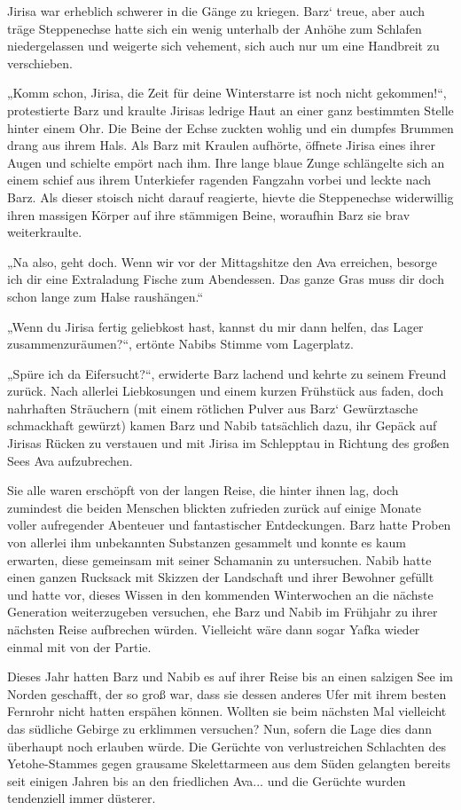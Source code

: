 Jirisa war erheblich schwerer in die Gänge zu kriegen. Barz‘ treue, aber auch träge Steppenechse hatte sich ein wenig unterhalb der Anhöhe zum Schlafen niedergelassen und weigerte sich vehement, sich auch nur um eine Handbreit zu verschieben.

„Komm schon, Jirisa, die Zeit für deine Winterstarre ist noch nicht gekommen!“, protestierte Barz und kraulte Jirisas ledrige Haut an einer ganz bestimmten Stelle hinter einem Ohr. Die Beine der Echse zuckten wohlig und ein dumpfes Brummen drang aus ihrem Hals. Als Barz mit Kraulen aufhörte, öffnete Jirisa eines ihrer Augen und schielte empört nach ihm. Ihre lange blaue Zunge schlängelte sich an einem schief aus ihrem Unterkiefer ragenden Fangzahn vorbei und leckte nach Barz. Als dieser stoisch nicht darauf reagierte, hievte die Steppenechse widerwillig ihren massigen Körper auf ihre stämmigen Beine, woraufhin Barz sie brav weiterkraulte.

„Na also, geht doch. Wenn wir vor der Mittagshitze den Ava erreichen, besorge ich dir eine Extraladung Fische zum Abendessen. Das ganze Gras muss dir doch schon lange zum Halse raushängen.“

„Wenn du Jirisa fertig geliebkost hast, kannst du mir dann helfen, das Lager zusammenzuräumen?“, ertönte Nabibs Stimme vom Lagerplatz.

„Spüre ich da Eifersucht?“, erwiderte Barz lachend und kehrte zu seinem Freund zurück. Nach allerlei Liebkosungen und einem kurzen Frühstück aus faden, doch nahrhaften Sträuchern (mit einem rötlichen Pulver aus Barz‘ Gewürztasche schmackhaft gewürzt) kamen Barz und Nabib tatsächlich dazu, ihr Gepäck auf Jirisas Rücken zu verstauen und mit Jirisa im Schlepptau in Richtung des großen Sees Ava aufzubrechen.

Sie alle waren erschöpft von der langen Reise, die hinter ihnen lag, doch zumindest die beiden Menschen blickten zufrieden zurück auf einige Monate voller aufregender Abenteuer und fantastischer Entdeckungen. Barz hatte Proben von allerlei ihm unbekannten Substanzen gesammelt und konnte es kaum erwarten, diese gemeinsam mit seiner Schamanin zu untersuchen. Nabib hatte einen ganzen Rucksack mit Skizzen der Landschaft und ihrer Bewohner gefüllt und hatte vor, dieses Wissen in den kommenden Winterwochen an die nächste Generation weiterzugeben versuchen, ehe Barz und Nabib im Frühjahr zu ihrer nächsten Reise aufbrechen würden. Vielleicht wäre dann sogar Yafka wieder einmal mit von der Partie.

Dieses Jahr hatten Barz und Nabib es auf ihrer Reise bis an einen salzigen See im Norden geschafft, der so groß war, dass sie dessen anderes Ufer mit ihrem besten Fernrohr nicht hatten erspähen können. Wollten sie beim nächsten Mal vielleicht das südliche Gebirge zu erklimmen versuchen? Nun, sofern die Lage dies dann überhaupt noch erlauben würde. Die Gerüchte von verlustreichen Schlachten des Yetohe-Stammes gegen grausame Skelettarmeen aus dem Süden gelangten bereits seit einigen Jahren bis an den friedlichen Ava... und die Gerüchte wurden tendenziell immer düsterer.

